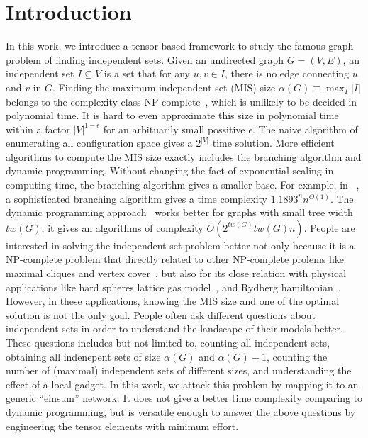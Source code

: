 \documentclass[review,onefignum,onetabnum]{siamart190516}
\newcommand{\<}{\langle}
\renewcommand{\>}{\rangle}
\newcounter{example}
\begin{document}
\section{Introduction}
In this work, we introduce a tensor based framework to study the famous graph problem of finding independent sets.
Given an undirected graph $G = (V,E)$, an independent set $I \subseteq V$ is a set that for any $u,v \in I$, there is no edge connecting $u$ and $v$ in $G$.
Finding the maximum independent set (MIS) size $\alpha(G) \equiv \max_{I}|I|$ belongs to the complexity class NP-complete~\cite{Hastad1996}, which is unlikely to be decided in polynomial time.
It is hard to even approximate this size in polynomial time within a factor $|V|^{1-\epsilon}$ for an arbituarily small possitive $\epsilon$.
The naive algorithm of enumerating all configuration space gives a $2^{|V|}$ time solution.
More efficient algorithms to compute the MIS size exactly includes the branching algorithm and dynamic programming.
Without changing the fact of exponential scaling in computing time, the branching algorithm gives a smaller base.
For example, in ~\cite{Xiao2017}, a sophisticated branching algorithm gives a time complexity $1.1893^n n ^{O(1)}$.
The dynamic programming approach~\cite{Courcelle1990,Fomin2013} works better for graphs with small tree width $tw(G)$, it gives an algorithms of complexity $O(2^{tw(G)}tw(G)n)$.
People are interested in solving the independent set problem better not only because it is a NP-complete problem that directly related to other NP-complete prolems like maximal cliques and vertex cover~\cite{Moore2011},
but also for its close relation with physical applications like hard spheres lattice gas model~\cite{Dyre2016}, and Rydberg hamiltonian~\cite{Pichler2018}.
However, in these applications, knowing the MIS size and one of the optimal solution is not the only goal.
People often ask different questions about independent sets in order to understand the landscape of their models better.
These questions includes but not limited to, counting all independent sets, obtaining all indenepent sets of size $\alpha(G)$ and $\alpha(G)-1$,
counting the number of (maximal) independent sets of different sizes, and understanding the effect of a local gadget.
In this work, we attack this problem by mapping it to an generic ``einsum'' network.
It does not give a better time complexity comparing to dynamic programming, but is versatile enough to answer the above questions by engineering the tensor elements with minimum effort.
\end{document}
